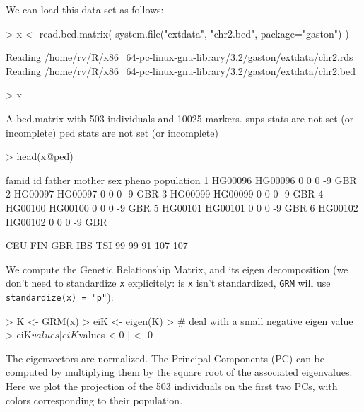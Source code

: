 \documentclass{article}
\renewenvironment{Schunk}{\vspace{\topsep}}{\vspace{\topsep}}
\begin{document}
  We can load this data set as follows:
\begin{Schunk}
\begin{Sinput}
> x <- read.bed.matrix( system.file("extdata", "chr2.bed", package="gaston") )
\end{Sinput}
\begin{Soutput}
Reading /home/rv/R/x86_64-pc-linux-gnu-library/3.2/gaston/extdata/chr2.rds 
Reading /home/rv/R/x86_64-pc-linux-gnu-library/3.2/gaston/extdata/chr2.bed 
\end{Soutput}
\begin{Sinput}
> x
\end{Sinput}
\begin{Soutput}
A bed.matrix with 503 individuals and 10025 markers.
snps stats are not set (or incomplete)
ped stats are not set (or incomplete)
\end{Soutput}
\begin{Sinput}
> head(x@ped)
\end{Sinput}
\begin{Soutput}
    famid      id father mother sex pheno population
1 HG00096 HG00096      0      0   0    -9        GBR
2 HG00097 HG00097      0      0   0    -9        GBR
3 HG00099 HG00099      0      0   0    -9        GBR
4 HG00100 HG00100      0      0   0    -9        GBR
5 HG00101 HG00101      0      0   0    -9        GBR
6 HG00102 HG00102      0      0   0    -9        GBR
\end{Soutput}
\begin{Soutput}
CEU FIN GBR IBS TSI 
 99  99  91 107 107 
\end{Soutput}
\end{Schunk}


We compute the Genetic Relationship Matrix, and its eigen decomposition (we don't
need to standardize \verb!x! explicitely: is \verb!x! isn't standardized, 
\verb!GRM! will use \verb!standardize(x) = "p"!):
\begin{Schunk}
\begin{Sinput}
> K <- GRM(x)
> eiK <- eigen(K)
> # deal with a small negative eigen value
> eiK$values[ eiK$values < 0 ] <- 0
\end{Sinput}
\end{Schunk}

  The eigenvectors are normalized. The Principal Components (PC) can be computed by 
  multiplying them by the square root of the associated eigenvalues. Here we plot
  the projection of the 503 individuals on the first two PCs, with colors corresponding
  to their population.
\end{document}
